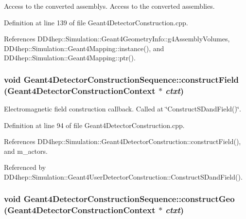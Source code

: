 Access to the converted assemblys. Access to the converted assemblies. 

Definition at line 139 of file Geant4DetectorConstruction.cpp.

References DD4hep::Simulation::Geant4GeometryInfo::g4AssemblyVolumes, DD4hep::Simulation::Geant4Mapping::instance(), and DD4hep::Simulation::Geant4Mapping::ptr().\hypertarget{class_d_d4hep_1_1_simulation_1_1_geant4_detector_construction_sequence_a74d488648a50cae0230ca9dedf678160}{
\subsubsection[{constructField}]{\setlength{\rightskip}{0pt plus 5cm}void Geant4DetectorConstructionSequence::constructField ({\bf Geant4DetectorConstructionContext} $\ast$ {\em ctxt})}}
\label{class_d_d4hep_1_1_simulation_1_1_geant4_detector_construction_sequence_a74d488648a50cae0230ca9dedf678160}


Electromagnetic field construction callback. Called at \char`\"{}ConstructSDandField()\char`\"{}. 

Definition at line 94 of file Geant4DetectorConstruction.cpp.

References DD4hep::Simulation::Geant4DetectorConstruction::constructField(), and m\_\-actors.

Referenced by DD4hep::Simulation::Geant4UserDetectorConstruction::ConstructSDandField().\hypertarget{class_d_d4hep_1_1_simulation_1_1_geant4_detector_construction_sequence_a7c2512ab15fa66370409585d60becc99}{
\subsubsection[{constructGeo}]{\setlength{\rightskip}{0pt plus 5cm}void Geant4DetectorConstructionSequence::constructGeo ({\bf Geant4DetectorConstructionContext} $\ast$ {\em ctxt})}}
\label{class_d_d4hep_1_1_simulation_1_1_geant4_detector_construction_sequence_a7c2512ab15fa66370409585d60becc99}


